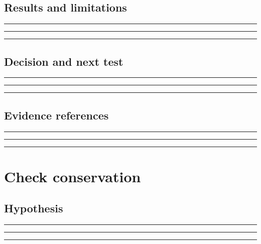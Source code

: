 \documentclass[11pt]{article}
\begin{document}
\subsection{Results and limitations}
\noindent\rule{\linewidth}{0.35pt}\par\vspace{0.22in}
\noindent\rule{\linewidth}{0.35pt}\par\vspace{0.22in}
\noindent\rule{\linewidth}{0.35pt}\par\vspace{0.18in}

\subsection{Decision and next test}
\noindent\rule{\linewidth}{0.35pt}\par\vspace{0.22in}
\noindent\rule{\linewidth}{0.35pt}\par\vspace{0.22in}
\noindent\rule{\linewidth}{0.35pt}\par\vspace{0.18in}

\subsection{Evidence references}
\noindent\rule{\linewidth}{0.35pt}\par\vspace{0.22in}
\noindent\rule{\linewidth}{0.35pt}\par\vspace{0.22in}
\noindent\rule{\linewidth}{0.35pt}\par\vspace{0.18in}
\clearpage

\section{Check conservation}

\subsection{Hypothesis}
\noindent\rule{\linewidth}{0.35pt}\par\vspace{0.22in}
\noindent\rule{\linewidth}{0.35pt}\par\vspace{0.22in}
\noindent\rule{\linewidth}{0.35pt}\par\vspace{0.18in}
\end{document}
